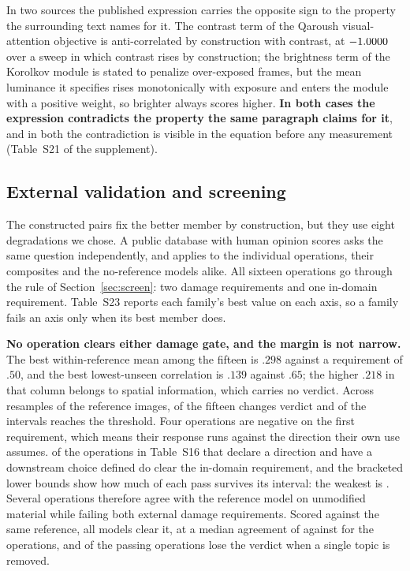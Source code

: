 In two sources the published expression carries the opposite sign to the property the
surrounding text names for it. The contrast term of the
Qaroush visual-attention objective is anti-correlated by construction with contrast, at $-1.0000{}$ over a sweep in which contrast rises by construction; the brightness term of the
Korolkov module is stated to penalize over-exposed frames, but the mean luminance it
specifies rises monotonically with exposure and enters the module with a positive weight,
so brighter always scores higher. \textbf{In both cases the expression contradicts the
property the same paragraph claims for it}, and in both the contradiction is visible in the
equation before any measurement (Table~S21 of the supplement).

\subsection{External validation and screening}\label{sec:screen_results}

The constructed pairs fix the better member by construction, but they use eight
degradations we chose. A public database with human opinion scores asks the same question
independently, and applies to the individual operations, their composites and the
no-reference models alike. All sixteen operations go through the rule of Section~\ref{sec:screen}: two damage
requirements and one in-domain requirement. Table~S23 reports each family's best value on
each axis, so a family fails an axis only when its best member does.

\textbf{No operation clears either damage gate, and the margin is not narrow.} The best
within-reference mean among the fifteen is $.298$ against a requirement of $.50$, and the
best lowest-unseen correlation is $.139$ against $.65$; the higher $.218$ in that column belongs to spatial information, which carries no verdict.
Across  resamples of the reference images,  of the fifteen changes
verdict and  of the intervals reaches the threshold. Four operations are
negative on the first requirement, which means their response runs against the direction
their own use assumes. \pisoTabPassam{} of the \pisoTabPop{} operations in Table~S16
that declare a direction and have a downstream choice defined do clear the in-domain
requirement, and the bracketed lower bounds show how much of each pass survives its
interval: the weakest is \pisoMenorLo{}. Several operations therefore agree with the reference model on unmodified material while
failing both external damage requirements. Scored against the same reference, all \pisoModN{} models clear it, at a median agreement
of \pisoKapMod{} against \pisoKapOp{} for the operations, and \pisoFrageis{} of the
passing operations lose the verdict when a single topic is removed.

